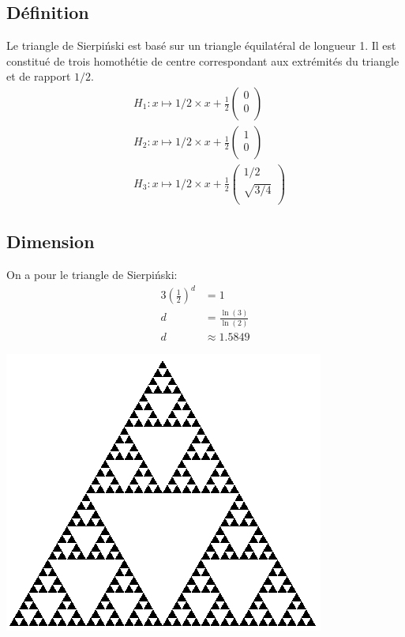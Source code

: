\documentclass[a4paper, 12pt]{report}
\begin{document}
			\subsection{Définition}
				Le triangle de Sierpiński est basé sur un triangle équilatéral de longueur 1. Il est constitué de trois homothétie de centre correspondant aux extrémités du triangle et de rapport $1/2$.
				\begin{align*}
					&H_1:x\mapsto 1/2\times x+\frac{1}{2}\left(	\begin{array}{ccc}
															0\\
															0\\
														\end{array}\right)\\
					&H_2:x\mapsto 1/2\times x+\frac{1}{2}\left(	\begin{array}{ccc}
															1\\
															0\\
														\end{array}\right)\\
					&H_3:x\mapsto 1/2\times x+\frac{1}{2}\left(	\begin{array}{ccc}
															1/2\\
															\sqrt{3/4}\\
														\end{array}\right)
				\end{align*}
			\subsection{Dimension}
				On a pour le triangle de Sierpiński:
				\begin{align*}
					 3\left(\frac{1}{2}\right)^d	&=1\\
												d	&=\frac{\ln(3)}{\ln(2)}\\
												d	&\approx 1.5849
				\end{align*}
				\begin{center}
					\includegraphics[scale=0.7]{Images/triangle}
				\end{center}
				
\end{document}
